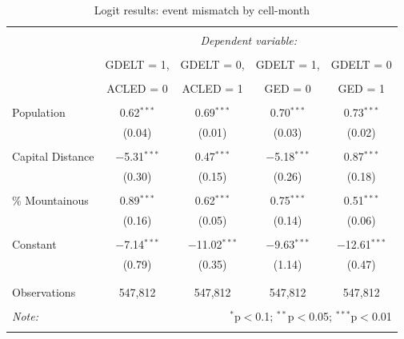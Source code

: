 \documentclass[hidelinks]{article}
\begin{document}
\begin{table}[!htbp] \centering 
  \caption{} 
  \label{} 
\begin{tabular}{@{\extracolsep{5pt}}lcccc} 
\\[-1.8ex]\hline 
\hline \\[-1.8ex] 
 & \multicolumn{4}{c}{\textit{Dependent variable:}} \\ 
\cline{2-5} 
\\[-1.8ex] & GDELT = 1, & GDELT = 0, & GDELT = 1, & GDELT = 0 \\ 
\\[-2.8ex] & ACLED = 0 & ACLED = 1 & GED = 0 & GED = 1 \\ 
\hline \\[-1.8ex] 
 Population & 0.62$^{***}$ & 0.69$^{***}$ & 0.70$^{***}$ & 0.73$^{***}$ \\ 
  & (0.04) & (0.01) & (0.03) & (0.02) \\ 
  & & & & \\ 
 Capital Distance & $-$5.31$^{***}$ & 0.47$^{***}$ & $-$5.18$^{***}$ & 0.87$^{***}$ \\ 
  & (0.30) & (0.15) & (0.26) & (0.18) \\ 
  & & & & \\ 
 \% Mountainous & 0.89$^{***}$ & 0.62$^{***}$ & 0.75$^{***}$ & 0.51$^{***}$ \\ 
  & (0.16) & (0.05) & (0.14) & (0.06) \\ 
  & & & & \\ 
 Constant & $-$7.14$^{***}$ & $-$11.02$^{***}$ & $-$9.63$^{***}$ & $-$12.61$^{***}$ \\ 
  & (0.79) & (0.35) & (1.14) & (0.47) \\ 
  & & & & \\ 
\hline \\[-1.8ex] 
Observations & 547,812 & 547,812 & 547,812 & 547,812 \\ 
\hline 
\hline \\[-1.8ex] 
\textit{Note:}  & \multicolumn{4}{r}{$^{*}$p$<$0.1; $^{**}$p$<$0.05; $^{***}$p$<$0.01} \\ 
\normalsize 
\end{tabular} 
\caption{Logit results: event mismatch by cell-month}
\end{table} 
\end{document}
